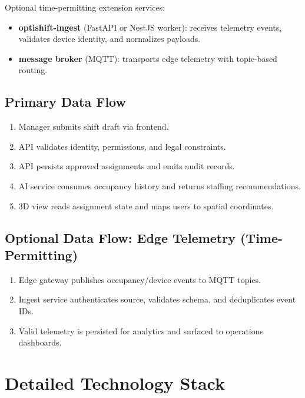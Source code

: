 \documentclass[11pt,a4paper]{article}
\begin{document}
Optional time-permitting extension services:
\begin{itemize}
  \item \textbf{optishift-ingest} (FastAPI or NestJS worker): receives telemetry events, validates device identity, and normalizes payloads.
  \item \textbf{message broker} (MQTT): transports edge telemetry with topic-based routing.
\end{itemize}

\subsection{Primary Data Flow}
\begin{enumerate}
  \item Manager submits shift draft via frontend.
  \item API validates identity, permissions, and legal constraints.
  \item API persists approved assignments and emits audit records.
  \item AI service consumes occupancy history and returns staffing recommendations.
  \item 3D view reads assignment state and maps users to spatial coordinates.
\end{enumerate}

\subsection{Optional Data Flow: Edge Telemetry (Time-Permitting)}
\begin{enumerate}
  \item Edge gateway publishes occupancy/device events to MQTT topics.
  \item Ingest service authenticates source, validates schema, and deduplicates event IDs.
  \item Valid telemetry is persisted for analytics and surfaced to operations dashboards.
\end{enumerate}

\section{Detailed Technology Stack}
\end{document}
